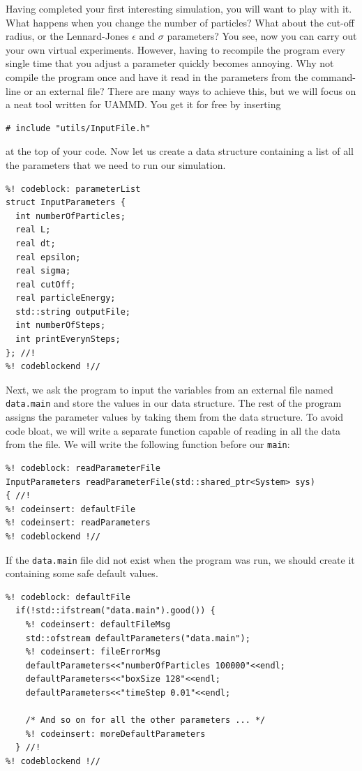 Having completed your first interesting simulation, you will want to play with
it. What happens when you change the number of particles? What about the cut-off
radius, or the Lennard-Jones $\epsilon$ and $\sigma$ parameters? You see, now
you can carry out your own virtual experiments. However, having to recompile the
program every single time that you adjust a parameter quickly becomes annoying.
Why not compile the program once and have it read in the parameters from the
command-line or an external file? There are many ways to achieve this, but we
will focus on a neat tool written for UAMMD. You get it for free by inserting
\begin{lstlisting}
# include "utils/InputFile.h"
\end{lstlisting}
at the top of your code. Now let us create a data structure containing a list of
all the parameters that we need to run our simulation.
\begin{lstlisting}
%! codeblock: parameterList
struct InputParameters {
  int numberOfParticles;
  real L;
  real dt;
  real epsilon;
  real sigma;
  real cutOff;
  real particleEnergy;
  std::string outputFile;
  int numberOfSteps;
  int printEverynSteps;
}; //!
%! codeblockend !//
\end{lstlisting}
Next, we ask the program to input the variables from an external file named
\texttt{data.main} and store the values in our data structure. The rest of the
program assigns the parameter values by taking them from the data structure.
To avoid code bloat, we will write a separate function capable of reading in
all the data from the file. We will write the following function before our
\texttt{main}:
\begin{lstlisting}
%! codeblock: readParameterFile
InputParameters readParameterFile(std::shared_ptr<System> sys)
{ //!
%! codeinsert: defaultFile
%! codeinsert: readParameters
%! codeblockend !//
\end{lstlisting}
If the \texttt{data.main} file did not exist when the program was run, we should
create it containing some safe default values.
\begin{lstlisting}
%! codeblock: defaultFile
  if(!std::ifstream("data.main").good()) {
    %! codeinsert: defaultFileMsg
    std::ofstream defaultParameters("data.main");
    %! codeinsert: fileErrorMsg
    defaultParameters<<"numberOfParticles 100000"<<endl;
    defaultParameters<<"boxSize 128"<<endl;
    defaultParameters<<"timeStep 0.01"<<endl;

    /* And so on for all the other parameters ... */
    %! codeinsert: moreDefaultParameters
  } //!
%! codeblockend !//
\end{lstlisting}

